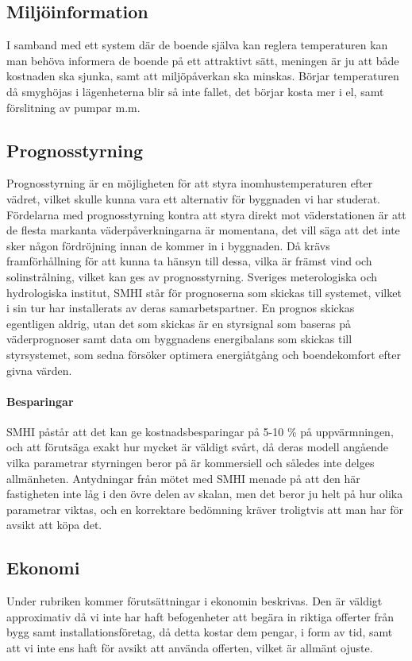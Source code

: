 \subsection{Miljöinformation}
I samband med ett system där de boende själva kan reglera temperaturen kan man behöva informera de boende på ett attraktivt sätt, meningen är ju att både kostnaden ska sjunka, samt att miljöpåverkan ska minskas. Börjar temperaturen då smyghöjas i lägenheterna blir så inte fallet, det börjar kosta mer i el, samt förslitning av pumpar m.m.  \cite{viivilla}


\subsection{Prognosstyrning}
Prognosstyrning är en möjligheten för att styra inomhustemperaturen efter vädret, vilket skulle kunna vara ett alternativ för byggnaden vi har studerat.
Fördelarna med prognosstyrning kontra att styra direkt mot väderstationen är att de flesta markanta väderpåverkningarna är momentana, det vill säga att det inte sker någon fördröjning innan de kommer in i byggnaden. Då krävs framförhållning för att kunna ta hänsyn till dessa, vilka är främst vind och solinstrålning, vilket kan ges av prognosstyrning. Sveriges meterologiska och hydrologiska institut, SMHI står för prognoserna som skickas till systemet, vilket i sin tur har installerats av deras samarbetspartner. En prognos skickas egentligen aldrig, utan det som skickas är en styrsignal som baseras på väderprognoser samt data om byggnadens energibalans som skickas till styrsystemet, som sedna försöker optimera energiåtgång och boendekomfort efter givna värden.

\paragraph{Besparingar}
SMHI påstår att det kan ge kostnadsbesparingar på 5-10 \% på uppvärmningen, och att förutsäga exakt hur mycket är väldigt svårt, då deras modell angående vilka parametrar styrningen beror på är kommersiell och således inte delges allmänheten. Antydningar från mötet med SMHI menade på att den här fastigheten inte låg i den övre delen av skalan, men det beror ju helt på hur olika parametrar viktas, och en korrektare bedömning kräver troligtvis att man har för avsikt att köpa det.

\subsection{Ekonomi}
Under rubriken kommer förutsättningar i ekonomin beskrivas. Den är väldigt approximativ då vi inte har haft befogenheter att begära in riktiga offerter från bygg samt installationsföretag, då detta kostar dem pengar, i form av tid, samt att vi inte ens haft för avsikt att använda offerten, vilket är allmänt ojuste.


